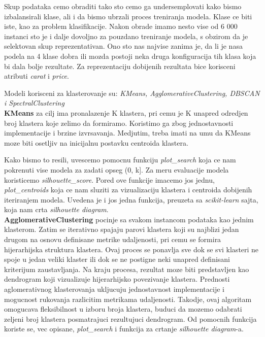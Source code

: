 \documentclass[10pt]{article}
\begin{document}
Skup podataka cemo obraditi tako sto cemo ga undersemplovati kako bismo izbalansirali klase, ali i da bismo ubrzali proces treniranja modela. Klase ce biti iste, kao za problem klasifikacije. Nakon obrade imamo nesto vise od 6 000 instanci sto je i dalje dovoljno za pouzdano treniranje modela, s obzirom da je selektovan skup reprezentativan. Ono sto nas najvise zanima je, da li je nasa podela na 4 klase dobra ili mozda postoji neka druga konfiguracija tih klasa koja bi dala bolje rezultate. Za reprezentaciju dobijenih rezultata bice korisceni atributi \textit{carat} i \textit{price}.

Modeli korisceni za klasterovanje su: \textit{KMeans, AgglomerativeClustering, DBSCAN i SpectralClustering}\\

\textbf{KMeans} za cilj ima pronalazenje K klastera, pri cemu je K unapred odredjen broj klastera koje zelimo da formiramo. Koristimo ga zbog jednostavnosti implementacije i brzine izvrsavanja. Medjutim, treba imati na umu da KMeans moze biti osetljiv na inicijalnu postavku centroida klastera. 

Kako bismo to resili, uvescemo pomocnu funkciju \textit{plot\_search} koja ce nam pokrenuti vise modela za zadati opseg (0, k]. Za meru evaluacije modela koristicemo \textit{silhouette\_score}. Pored ove funkcije imacemo jos jednu, \textit{plot\_centroids} koja ce nam sluziti za vizualizaciju klastera i centroida dobijenih iteriranjem modela. Uvedena je i jos jedna funkcija, preuzeta sa \textit{scikit-learn} sajta, koja nam crta \textit{silhouette diagram}.\\ 

\textbf{AgglomerativeClustering} pocinje sa svakom instancom podataka kao jednim klasterom. Zatim se iterativno spajaju parovi klastera koji su najblizi jedan drugom na osnovu definisane metrike udaljenosti, pri cemu se formira hijerarhijska struktura klastera. Ovaj proces se ponavlja sve dok se svi klasteri ne spoje u jedan veliki klaster ili dok se ne postigne neki unapred definisani kriterijum zaustavljanja. Na kraju procesa, rezultat moze biti predstavljen kao dendrogram koji vizualizuje hijerarhijsko povezivanje klastera. Prednosti aglomerativnog klasterovanja ukljucuju jednostavnost implementacije i mogucnost rukovanja razlicitim metrikama udaljenosti. Takodje, ovaj algoritam omogucava fleksibilnost u izboru broja klastera, buduci da mozemo odabrati zeljeni broj klastera posmatrajuci rezultujuci dendrogram. Od pomocnih funkcija koriste se, vec opisane, \textit{plot\_search} i funkcija za crtanje \textit{silhouette diagram}-a.\\
\end{document}
